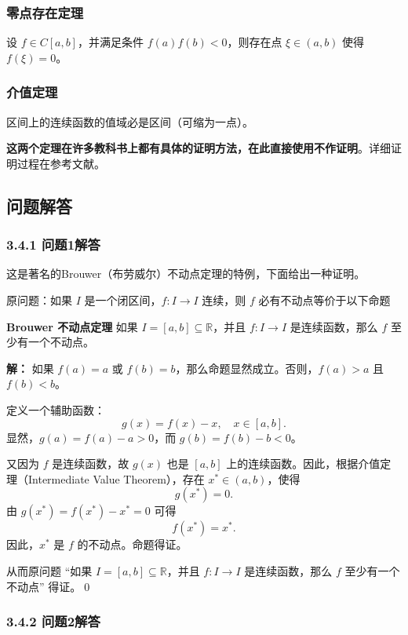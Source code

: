 \documentclass[12pt]{ctexart}
\begin{document}
\subsubsection{零点存在定理}

设 $f \in C[a, b]$，并满足条件 $f(a)f(b) < 0$，则存在点 $\xi \in (a, b)$ 使得 $f(\xi) = 0$。

\subsubsection{介值定理}

区间上的连续函数的值域必是区间（可缩为一点）。

\textbf{这两个定理在许多教科书上都有具体的证明方法，在此直接使用不作证明}。详细证明过程在参考文献\cite{key5}。

\subsection{问题解答}

\subsubsection*{3.4.1  问题1解答}

这是著名的Brouwer（布劳威尔）不动点定理的特例，下面给出一种证明。

原问题：如果 $I$ 是一个闭区间，$f: I \to I$ 连续，则 $f$ 必有不动点等价于以下命题

\textbf{Brouwer 不动点定理}
如果 $I = [a, b] \subseteq \mathbb{R}$，并且 $f: I \to I$ 是连续函数，那么 $f$ 至少有一个不动点。\cite{key8}


\textbf{解：} 
如果 $f(a) = a$ 或 $f(b) = b$，那么命题显然成立。否则，$f(a) > a$ 且 $f(b) < b$。

定义一个辅助函数：
\[
g(x) = f(x) - x, \quad x \in [a, b].
\]
显然，$g(a) = f(a) - a > 0$，而 $g(b) = f(b) - b < 0$。

又因为 $f$ 是连续函数，故 $g(x)$ 也是 $[a, b]$ 上的连续函数。因此，根据介值定理（Intermediate Value Theorem），存在 $x^* \in (a, b)$，使得
\[
g(x^*) = 0.
\]
由 $g(x^*) = f(x^*) - x^* = 0$ 可得
\[
f(x^*) = x^*.
\]
因此，$x^*$ 是 $f$ 的不动点。命题得证。

从而原问题 “如果 $I = [a, b] \subseteq \mathbb{R}$，并且 $f: I \to I$ 是连续函数，那么 $f$ 至少有一个不动点” 得证。\qed 

\subsubsection*{3.4.2  问题2解答}
\end{document}
